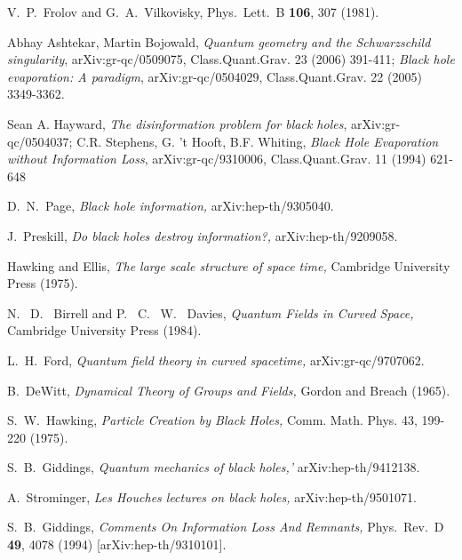 \documentclass[12pt]{article}
\begin{document}
\begin{thebibliography}{99}
V.~P.~Frolov and G.~A.~Vilkovisky,
Phys.\ Lett.\ B {\bf 106}, 307 (1981).

 Abhay Ashtekar, Martin Bojowald, {\it Quantum geometry and the Schwarzschild singularity},
arXiv:gr-qc/0509075,  Class.Quant.Grav. 23 (2006) 391-411;  {\it Black hole evaporation: A paradigm}, arXiv:gr-qc/0504029,  Class.Quant.Grav. 22 (2005) 3349-3362. 

Sean A. Hayward, {\it The disinformation problem for black holes},
arXiv:gr-qc/0504037; C.R. Stephens, G. 't Hooft, B.F. Whiting, {\it Black Hole Evaporation without Information Loss}, 
arXiv:gr-qc/9310006, Class.Quant.Grav. 11 (1994) 621-648 

D.~N.~Page, {\it Black hole information,}
arXiv:hep-th/9305040. 

J.~Preskill, {\it Do black holes destroy information?,} 
arXiv:hep-th/9209058. %

 Hawking and Ellis, {\it The large scale structure of space time,} Cambridge University Press (1975).



  N.~ D.~ Birrell and P.~ C.~ W.~ Davies, {\it Quantum Fields in Curved Space,} 
Cambridge University Press (1984). 

 L.~H.~Ford, {\it Quantum field theory in curved spacetime,} arXiv:gr-qc/9707062. 

 B.~DeWitt, {\it Dynamical Theory of Groups and Fields,} Gordon and Breach (1965).

 S.~W.~Hawking, 
{\it Particle Creation by Black Holes,} 
Comm. Math. Phys. 43, 199-220 (1975).



 
 S.~B.~Giddings, 
{\it Quantum mechanics of black holes,'}
arXiv:hep-th/9412138. %

A.~Strominger, 
{\it Les Houches lectures on black holes,}
arXiv:hep-th/9501071. %



S.~B.~Giddings, 
{\it Comments On Information Loss And Remnants,} 
Phys.\ Rev.\ D {\bf 49}, 4078 (1994) [arXiv:hep-th/9310101]. 


\end{thebibliography}
\end{document}
